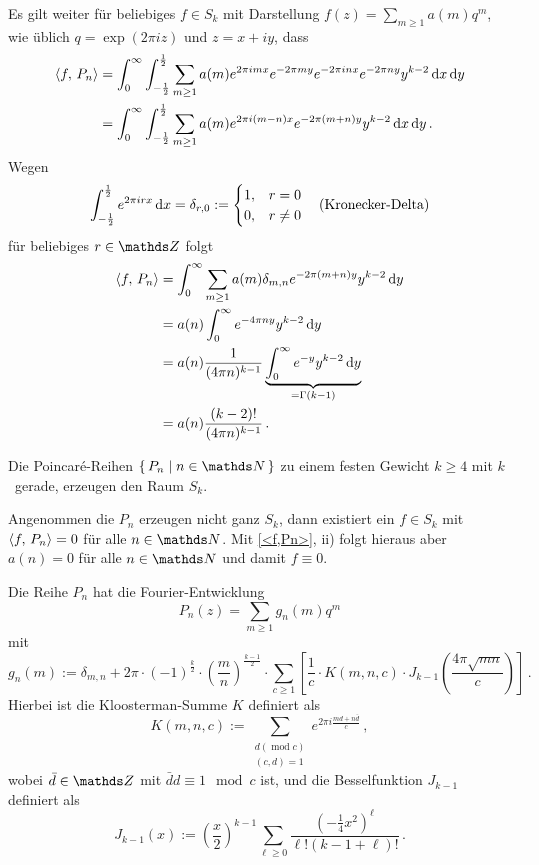 \begin{bewe-list}
Es gilt weiter für beliebiges $f \in S_k$ mit Darstellung $f(z) = \sum_{m \geq 1} a(m)q^m$, wie üblich $q = \exp(2\pi iz)$ und $z = x + iy$, dass
\begin{align*}
	\scalarprd {f}{P_n} &= \int_0^\infty \int_{-\frac 12}^{\frac 12} \sum_{m \geq 1} a(m) e^{2 \pi imx}e^{-2\pi my}e^{-2\pi inx}e^{-2\pi ny}y^{k-2} \opd x \opd y\\
	&= \int_0^\infty \int_{-\frac 12}^{\frac 12} \sum_{m \geq 1} a(m) e^{2 \pi i(m-n)x}e^{-2\pi (m+n)y}y^{k-2} \opd x \opd y\,.
\end{align*}
Wegen 
\[
	\int_{- \frac 12}^{\frac 12} e^{2 \pi irx} \,\mathrm{d} x = \delta_{r,0} := \begin{cases}1, & r = 0\\0, & r \neq 0\end{cases} \quad \text{(Kronecker-Delta)}
\]
für beliebiges $r \in \ZZ$ folgt
\begin{align*}
	\scalarprd {f}{P_n} &= \int_0^\infty \sum_{m \geq 1} a(m) \delta_{m,n} e^{-2\pi (m+n)y}y^{k-2} \opd y \\
	&= a(n) \int_0^\infty e^{-4\pi ny} y^{k-2} \opd y \\
	&= a(n) \frac{1}{(4\pi n)^{k-1}} \underbrace{\int_0^\infty e^{-y} y^{k-2} \opd y}_{= \Gamma(k-1)} \\
	&= a(n) \frac{(k-2)!}{(4\pi n)^{k-1}}
	\,.
\end{align*}
\end{bewe-list}

\begin{koro}
Die Poincaré-Reihen $\Set{ P_n \mid n \in \NN}$ zu einem festen Gewicht $k \geq 4$ mit $k$~gerade, erzeugen den Raum $S_k$.
\end{koro}

\begin{bewe}
Angenommen die $P_n$ erzeugen nicht ganz $S_k$, dann existiert ein $f \in S_k$ mit $\scalarprd {f}{P_n} = 0$ für alle $n \in \NN$. Mit \autoref{<f,Pn>}, ii) folgt hieraus aber $a(n) = 0$ für alle $n \in \NN$ und damit $f \equiv 0$.
\end{bewe}

\begin{satz}\label{satz:Pn_Fourier}
Die Reihe $P_n$ hat die Fourier-Entwicklung
\[
	P_n(z) = \sum_{m \geq 1} g_n(m) q^m
\]
mit
\[
	g_n(m) := \delta_{m,n} + 2\pi \cdot (-1)^{\frac k2} \cdot \left(\frac mn\right)^{\frac {k-1}2} \cdot \sum_{c \geq 1} \left[ \frac 1c \cdot K(m,n,c) \cdot J_{k-1}\left(\frac{4\pi \sqrt{mn}}c\right) \right]
	\,.
\]
Hierbei ist die Kloosterman-Summe $K$ definiert als
\[
	K(m,n,c) := \sum_{\substack{d (\operatorname{mod} c) \\ (c,d)=1}} e^{2\pi i \frac{md + n\bar{d}}{c}}
	\,,
\]
wobei $\bar d \in \ZZ$ mit $\bar d d \equiv 1 \mod c$ ist, und die Besselfunktion $J_{k-1}$ definiert als
\[
	J_{k-1}(x) := \left(\frac x2\right)^{k-1} \sum_{\ell \geq 0} \frac{(-\frac 14 x^2)^\ell}{\ell! (k-1+\ell)!}
	\,.
\]
\end{satz}

